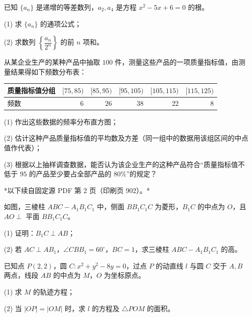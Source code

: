 \begin{question}
已知 $\{a_n\}$ 是递增的等差数列，$a_2,a_4$ 是方程 $x^2-5x+6=0$ 的根。

(1) 求 $\{a_n\}$ 的通项公式；

(2) 求数列 $\left\{\dfrac{a_n}{2^n}\right\}$ 的前 $n$ 项和。

\Needspace{0.4\textheight}
\end{question}
\begin{question}
从某企业生产的某种产品中抽取 $100$ 件，测量这些产品的一项质量指标值，由测量结果得如下频数分布表：

\begin{center}
\begin{tabular}{lrrrrr}
\toprule
质量指标值分组 & $[75,85)$ & $[85,95)$ & $[95,105)$ & $[105,115)$ & $[115,125)$ \\
\midrule
频数 & $6$ & $26$ & $38$ & $22$ & $8$ \\
\bottomrule
\end{tabular}
\end{center}

(1) 作出这些数据的频率分布直方图；
\nopagebreak[4]
\begin{center}\end{center}
\nopagebreak[4]
(2) 估计这种产品质量指标值的平均数及方差（同一组中的数据用该组区间的中点值作代表）；

(3) 根据以上抽样调查数据，能否认为该企业生产的这种产品符合“质量指标值不低于 $95$ 的产品至少要占全部产品的 $80\%$”的规定？

\par\medskip

*以下续自固定源 PDF 第 2 页（印刷页 902）。*

\Needspace{0.4\textheight}
\end{question}
\begin{question}
如图，三棱柱 $ABC-A_1B_1C_1$ 中，侧面 $BB_1C_1C$ 为菱形，$B_1C$ 的中点为 $O$，且 $AO\perp$ 平面 $BB_1C_1C$。
\nopagebreak[4]
\begin{center}\end{center}
\nopagebreak[4]
(1) 证明：$B_1C\perp AB$；

(2) 若 $AC\perp AB_1$，$\angle CBB_1=60^\circ$，$BC=1$，求三棱柱 $ABC-A_1B_1C_1$ 的高。

\end{question}
\begin{question}
已知点 $P(2,2)$，圆 $C:x^2+y^2-8y=0$，过点 $P$ 的动直线 $l$ 与圆 $C$ 交于 $A,B$ 两点，线段 $AB$ 的中点为 $M$，$O$ 为坐标原点。

(1) 求 $M$ 的轨迹方程；

(2) 当 $|OP|=|OM|$ 时，求 $l$ 的方程及 $\triangle POM$ 的面积。

\end{question}
